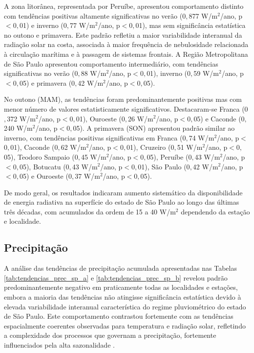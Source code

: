 A zona litorânea, representada por Peruíbe, apresentou comportamento distinto com tendências positivas altamente significativas no verão (0${,}$877 W/m$^2$/ano, p$<$0${,}$01) e inverno (0${,}$77 W/m$^2$/ano, p$<$0${,}$01), mas sem significância estatística no outono e primavera. Este padrão refletiu a maior variabilidade interanual da radiação solar na costa, associada à maior frequência de nebulosidade relacionada à circulação marítima e à passagem de sistemas frontais. A Região Metropolitana de São Paulo apresentou comportamento intermediário, com tendências significativas no verão (0${,}$88 W/m$^2$/ano, p$<$0${,}$01), inverno (0${,}$59 W/m$^2$/ano, p$<$0${,}$05) e primavera (0${,}$42 W/m$^2$/ano, p$<$0${,}$05).

No outono (MAM), as tendências foram predominantemente positivas mas com menor número de valores estatisticamente significativos. Destacaram-se Franca (0${,}$372 W/m$^2$/ano, p$<$0${,}$01), Ouroeste (0${,}$26 W/m$^2$/ano, p$<$0${,}$05) e Caconde (0${,}$240 W/m$^2$/ano, p$<$0${,}$05). A primavera (SON) apresentou padrão similar ao inverno, com tendências positivas significativas em Franca (0${,}$74 W/m$^2$/ano, p$<$0${,}$01), Caconde (0${,}$62 W/m$^2$/ano, p$<$0${,}$01), Cruzeiro (0${,}$51 W/m$^2$/ano, p$<$0${,}$05), Teodoro Sampaio (0${,}$45 W/m$^2$/ano, p$<$0${,}$05), Peruíbe (0${,}$43 W/m$^2$/ano, p$<$0${,}$05), Botucatu (0${,}$43 W/m$^2$/ano, p$<$0${,}$01), São Paulo (0${,}$42 W/m$^2$/ano, p$<$0${,}$05) e Ouroeste (0${,}$37 W/m$^2$/ano, p$<$0${,}$05).

De modo geral, os resultados indicaram aumento sistemático da disponibilidade de energia radiativa na superfície do estado de São Paulo ao longo das últimas três décadas, com acumulados da ordem de 15 a 40 W/m$^2$ dependendo da estação e localidade.

\subsection{Precipitação}

A análise das tendências de precipitação acumulada apresentadas nas Tabelas \ref{tab:tendencias_prec_sp_a} e \ref{tab:tendencias_prec_sp_b} revelou padrão predominantemente negativo em praticamente todas as localidades e estações, embora a maioria das tendências não atingisse significância estatística devido à elevada variabilidade interanual característica do regime pluviométrico do estado de São Paulo. Este comportamento contrastou fortemente com as tendências espacialmente coerentes observadas para temperatura e radiação solar, refletindo a complexidade dos processos que governam a precipitação, fortemente influenciados pela alta sazonalidade \citep{alvares2013, Groisman2005}.

